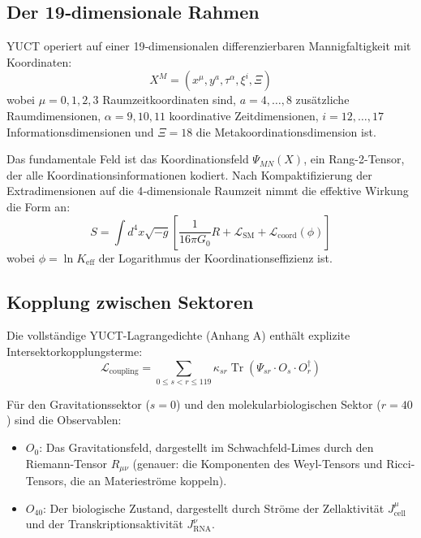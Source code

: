\documentclass[12pt,a4paper]{article}
\theoremstyle{remark}
\newcommand{\Keff}{K_{\mathrm{eff}}}
\begin{document}
	\subsection{Der 19‑dimensionale Rahmen}
	
	YUCT operiert auf einer 19‑dimensionalen differenzierbaren Mannigfaltigkeit mit Koordinaten:
	\[
	X^M = (x^\mu, y^a, \tau^\alpha, \xi^i, \Xi)
	\]
	wobei \(\mu = 0,1,2,3\) Raumzeitkoordinaten sind, \(a = 4,\dots,8\) zusätzliche Raumdimensionen, \(\alpha = 9,10,11\) koordinative Zeitdimensionen, \(i = 12,\dots,17\) Informationsdimensionen und \(\Xi = 18\) die Metakoordinationsdimension ist.
	
	Das fundamentale Feld ist das Koordinationsfeld \(\Psi_{MN}(X)\), ein Rang-2-Tensor, der alle Koordinationsinformationen kodiert. Nach Kompaktifizierung der Extradimensionen auf die 4‑dimensionale Raumzeit nimmt die effektive Wirkung die Form an:
	\begin{equation}
		S = \int d^4x \sqrt{-g} \left[ \frac{1}{16\pi G_0} R + \mathcal{L}_{\text{SM}} + \mathcal{L}_{\text{coord}}(\phi) \right]
		\label{eq:action}
	\end{equation}
	wobei \(\phi = \ln \Keff\) der Logarithmus der Koordinationseffizienz ist.
	
	\subsection{Kopplung zwischen Sektoren}
	
	Die vollständige YUCT-Lagrangedichte (Anhang A) enthält explizite Intersektorkopplungsterme:
	\begin{equation}
		\mathcal{L}_{\text{coupling}} = \sum_{0 \le s < r \le 119} \kappa_{sr} \operatorname{Tr}(\Psi_{sr} \cdot O_s \cdot O_r^\dagger)
		\label{eq:full-coupling}
	\end{equation}
	
	Für den Gravitationssektor (\(s=0\)) und den molekularbiologischen Sektor (\(r=40\)) sind die Observablen:
	\begin{itemize}
		\item \(O_0\): Das Gravitationsfeld, dargestellt im Schwachfeld-Limes durch den Riemann-Tensor \(R_{\mu\nu}\) (genauer: die Komponenten des Weyl-Tensors und Ricci-Tensors, die an Materieströme koppeln).
		\item \(O_{40}\): Der biologische Zustand, dargestellt durch Ströme der Zellaktivität \(J_{\text{cell}}^\mu\) und der Transkriptionsaktivität \(J_{\text{RNA}}^\nu\).
	\end{itemize}
	
\end{document}
